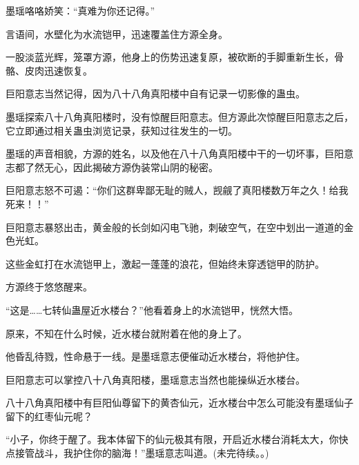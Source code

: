 \begin{this_body}
墨瑶咯咯娇笑：“真难为你还记得。”

言语间，水壁化为水流铠甲，迅速覆盖住方源全身。

一股淡蓝光辉，笼罩方源，他身上的伤势迅速复原，被砍断的手脚重新生长，骨骼、皮肉迅速恢复。

巨阳意志当然记得，因为八十八角真阳楼中自有记录一切影像的蛊虫。

墨瑶探索八十八角真阳楼时，没有惊醒巨阳意志。但方源此次惊醒巨阳意志之后，它立即通过相关蛊虫浏览记录，获知过往发生的一切。

墨瑶的声音相貌，方源的姓名，以及他在八十八角真阳楼中干的一切坏事，巨阳意志都了然无心，因此揭破方源伪装常山阴的秘密。

巨阳意志怒不可遏：“你们这群卑鄙无耻的贼人，觊觎了真阳楼数万年之久！给我死来！！”

巨阳意志暴怒出击，黄金般的长剑如闪电飞驰，刺破空气，在空中划出一道道的金色光虹。

这些金虹打在水流铠甲上，激起一蓬蓬的浪花，但始终未穿透铠甲的防护。

方源终于悠悠醒来。

“这是……七转仙蛊屋近水楼台？”他看着身上的水流铠甲，恍然大悟。

原来，不知在什么时候，近水楼台就附着在他的身上了。

他昏乱待戮，性命悬于一线。是墨瑶意志便催动近水楼台，将他护住。

巨阳意志可以掌控八十八角真阳楼，墨瑶意志当然也能操纵近水楼台。

八十八角真阳楼中有巨阳仙尊留下的黄杏仙元，近水楼台中怎么可能没有墨瑶仙子留下的红枣仙元呢？

“小子，你终于醒了。我本体留下的仙元极其有限，开启近水楼台消耗太大，你快点接管战斗，我护住你的脑海！”墨瑶意志叫道。(未完待续。。)

\end{this_body}

